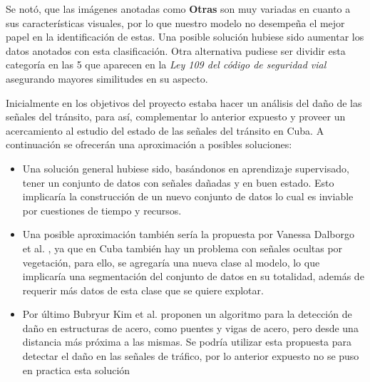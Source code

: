 \documentclass{article}
\begin{document}
Se notó, que las imágenes anotadas como \textbf{Otras} son muy variadas en cuanto a sus características visuales, por lo que nuestro modelo no desempeña el mejor papel en la identificación de estas. Una posible solución hubiese sido aumentar los datos anotados con esta clasificación. Otra alternativa pudiese ser dividir esta categoría en las 5 que aparecen en la \textit{Ley 109 del código de seguridad vial}\cite{ref7} asegurando mayores similitudes en su aspecto.

Inicialmente en los objetivos del proyecto estaba hacer un análisis del daño de las señales del tránsito, para así, complementar lo anterior expuesto y proveer un acercamiento al estudio del estado de las señales del tránsito en Cuba. A continuación se ofrecerán una aproximación a posibles soluciones:
\begin{itemize}
 \item{Una solución general hubiese sido, basándonos en aprendizaje supervisado, tener un conjunto de datos con señales dañadas y en buen estado. Esto implicaría la construcción de un nuevo conjunto de datos lo cual es inviable por cuestiones de tiempo y recursos.}
 \item{Una posible aproximación también sería la propuesta por Vanessa Dalborgo et al. \cite{ref11}, ya que en Cuba también hay un problema con señales ocultas por vegetación, para ello, se agregaría una nueva clase al modelo, lo que implicaría una segmentación del conjunto de datos en su totalidad, además de requerir más datos de esta clase que se quiere explotar.}
\item{Por último Bubryur Kim et al. \cite{ref4} proponen un algoritmo para la detección de daño en estructuras de acero, como puentes  y vigas de acero, pero desde una distancia más próxima a las mismas. Se podría utilizar esta propuesta para detectar el daño en las señales de tráfico, por lo anterior expuesto no se puso en practica esta solución}
\end{itemize}

\end{document}
